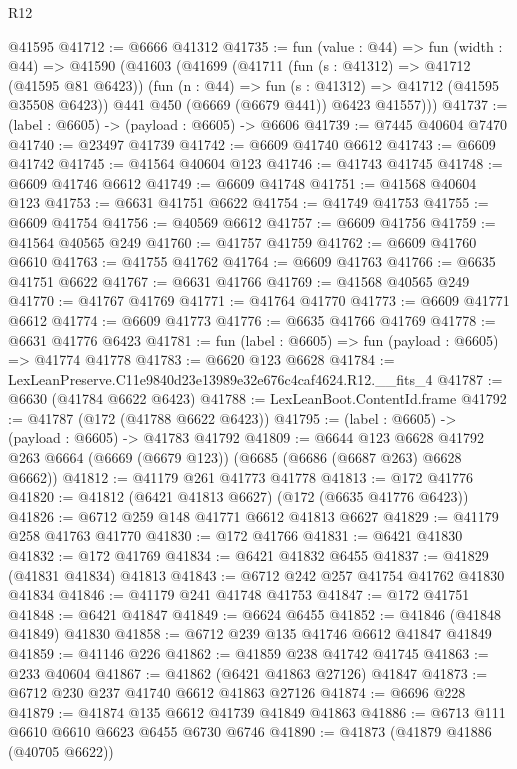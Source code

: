 \begin{lexlean}{R12}
\begin{coremodule}
    @41595
@41712 := @6666 @41312
@41735 := fun (value : @44) =>
  fun (width : @44) =>
  @41590
    (@41603
      (@41699
        (@41711
          (fun (s : @41312) => @41712 (@41595 @81 @6423))
          (fun (n : @44) => fun (s : @41312) => @41712 (@41595 @35508 @6423))
          @441
          @450
          (@6669 (@6679 @441))
          @6423
          @41557)))
@41737 := (label : @6605) -> (payload : @6605) -> @6606
@41739 := @7445 @40604 @7470
@41740 := @23497 @41739
@41742 := @6609 @41740 @6612
@41743 := @6609 @41742
@41745 := @41564 @40604 @123
@41746 := @41743 @41745
@41748 := @6609 @41746 @6612
@41749 := @6609 @41748
@41751 := @41568 @40604 @123
@41753 := @6631 @41751 @6622
@41754 := @41749 @41753
@41755 := @6609 @41754
@41756 := @40569 @6612
@41757 := @6609 @41756
@41759 := @41564 @40565 @249
@41760 := @41757 @41759
@41762 := @6609 @41760 @6610
@41763 := @41755 @41762
@41764 := @6609 @41763
@41766 := @6635 @41751 @6622
@41767 := @6631 @41766
@41769 := @41568 @40565 @249
@41770 := @41767 @41769
@41771 := @41764 @41770
@41773 := @6609 @41771 @6612
@41774 := @6609 @41773
@41776 := @6635 @41766 @41769
@41778 := @6631 @41776 @6423
@41781 := fun (label : @6605) => fun (payload : @6605) => @41774 @41778
@41783 := @6620 @123 @6628
@41784 := LexLeanPreserve.C11e9840d23e13989e32e676c4caf4624.R12.__fits_4
@41787 := @6630 (@41784 @6622 @6423)
@41788 := LexLeanBoot.ContentId.frame
@41792 := @41787 (@172 (@41788 @6622 @6423))
@41795 := (label : @6605) -> (payload : @6605) -> @41783 @41792
@41809 := @6644
    @123
    @6628
    @41792
    @263
    @6664
    (@6669 (@6679 @123))
    (@6685 (@6686 (@6687 @263) @6628 @6662))
@41812 := @41179 @261 @41773 @41778
@41813 := @172 @41776
@41820 := @41812 (@6421 @41813 @6627) (@172 (@6635 @41776 @6423))
@41826 := @6712 @259 @148 @41771 @6612 @41813 @6627
@41829 := @41179 @258 @41763 @41770
@41830 := @172 @41766
@41831 := @6421 @41830
@41832 := @172 @41769
@41834 := @6421 @41832 @6455
@41837 := @41829 (@41831 @41834) @41813
@41843 := @6712 @242 @257 @41754 @41762 @41830 @41834
@41846 := @41179 @241 @41748 @41753
@41847 := @172 @41751
@41848 := @6421 @41847
@41849 := @6624 @6455
@41852 := @41846 (@41848 @41849) @41830
@41858 := @6712 @239 @135 @41746 @6612 @41847 @41849
@41859 := @41146 @226
@41862 := @41859 @238 @41742 @41745
@41863 := @233 @40604
@41867 := @41862 (@6421 @41863 @27126) @41847
@41873 := @6712 @230 @237 @41740 @6612 @41863 @27126
@41874 := @6696 @228
@41879 := @41874 @135 @6612 @41739 @41849 @41863
@41886 := @6713 @111 @6610 @6610 @6623 @6455 @6730 @6746
@41890 := @41873 (@41879 @41886 (@40705 @6622))

\end{coremodule}
\end{lexlean}
